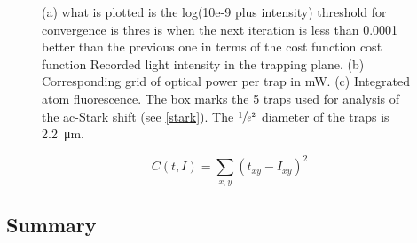 \documentclass[../Thesis-IJspeert.tex]{subfiles}
\begin{document}
\begin{figure}[t]

	\caption{(a) what is plotted is the log(10e-9 plus intensity)  threshold for convergence is thres is when the next iteration is less than 0.0001 better than the previous one in terms of the cost function  cost function Recorded light intensity in the trapping plane. (b) Corresponding grid of optical power per trap in mW. (c) Integrated atom fluorescence. The box marks the 5 traps used for analysis of the ac-Stark shift (see \autoref{stark}). The $\sfrac{1}{e^2}$ diameter of the traps is \SI{2.2}{\micro\meter}.}
\end{figure}

\begin{equation}
	C(t,I)=\sum_{x,y} \left(t_{xy}-I_{xy}\right)^2
\end{equation}


\subsection{Summary}
\end{document}

